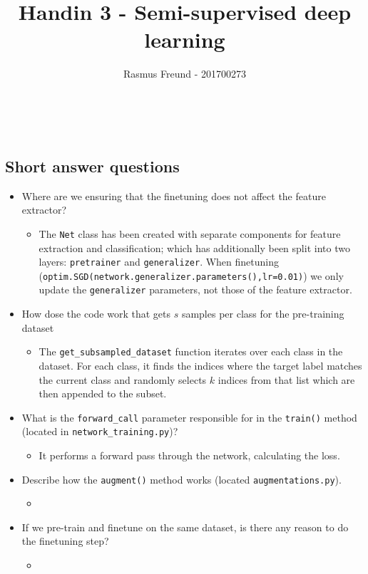 \documentclass[english,11pt,a4paper,titlepage]{report}
\title{Handin 3 - Semi-supervised deep learning}
\author{Rasmus Freund - 201700273}
\begin{document}
	\maketitle\\
	\subsection*{Short answer questions}
	\begin{itemize}
		\item Where are we ensuring that the finetuning does not affect the feature extractor?
		\begin{itemize}
			\item The \verb*|Net| class has been created with separate components for feature extraction and classification; which has additionally been split into two layers: \verb*|pretrainer| and \verb*|generalizer|. When finetuning (\verb*|optim.SGD(network.generalizer.parameters(),lr=0.01)|) we only update the \verb*|generalizer| parameters, not those of the feature extractor.  
		\end{itemize}
		\item How dose the code work that gets $s$ samples per class for the pre-training dataset
		\begin{itemize}
			\item The \verb*|get_subsampled_dataset| function iterates over each class in the dataset. For each class, it finds the indices where the target label matches the current class and randomly selects $k$ indices from that list which are then appended to the subset.
		\end{itemize}
		\item What is the \verb*|forward_call| parameter responsible for in the \verb*|train()| method (located in \verb*|network_training.py|)?
		\begin{itemize}
			\item It performs a forward pass through the network, calculating the loss.
		\end{itemize}
		\item Describe how the \verb*|augment()| method works (located \verb*|augmentations.py|).
		\begin{itemize}
			\item 
		\end{itemize}
		\item If we pre-train and finetune on the same dataset, is there any reason to do the finetuning step?
		\begin{itemize}
			\item 
		\end{itemize}
	\end{itemize}
\end{document}
